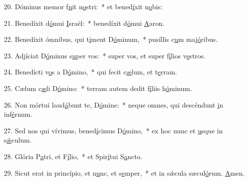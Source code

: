 20. Dóminus memor f\uline{u}it n\uline{o}stri:~* et bened\uline{í}xit n\uline{o}bis:\par 
21. Benedíxit d\uline{ó}mui \uline{I}sraël:~* benedíxit d\uline{ó}mui \uline{A}aron.\par 
22. Benedíxit ómnibus, qui t\uline{i}ment D\uline{ó}minum,~* pusíllis c\uline{u}m maj\uline{ó}ribus.\par 
23. Adjíciat D\uline{ó}minus s\uline{u}per vos:~* super vos, et super f\uline{í}lios v\uline{e}stros.\par 
24. Benedícti v\uline{o}s a D\uline{ó}mino,~* qui fecit c\uline{æ}lum, et t\uline{e}rram.\par 
25. Cælum c\uline{æ}li D\uline{ó}mino:~* terram autem dedit f\uline{í}liis h\uline{ó}minum.\par 
26. Non mórtui laud\uline{á}bunt te, D\uline{ó}mine:~* neque omnes, qui descéndunt \uline{i}n inf\uline{é}rnum.\par 
27. Sed nos qui vívimus, bened\uline{í}cimus D\uline{ó}mino,~* ex hoc nunc et \uline{u}sque in s\uline{ǽ}culum.\par 
28. Glória P\uline{a}tri, et F\uline{í}lio,~* et Spir\uline{í}tui S\uline{a}ncto.\par 
29. Sicut erat in princípio, et n\uline{u}nc, et s\uline{e}mper,~* et in sǽcula sæcul\uline{ó}rum. \uline{A}men.\par 
